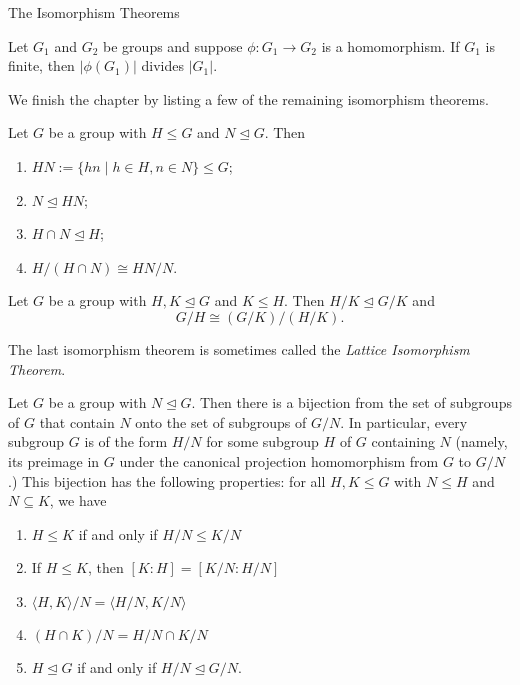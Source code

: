 \begin{section}{The Isomorphism Theorems}
\begin{theorem}
Let $G_1$ and $G_2$ be groups and suppose $\phi:G_1\to G_2$ is a homomorphism. If $G_1$ is finite, then $|\phi(G_1)|$ divides $|G_1|$.
\end{theorem}

We finish the chapter by listing a few of the remaining isomorphism theorems.%

\begin{theorem}
Let $G$ be a group with $H\leq G$ and $N\trianglelefteq G$.  Then
\begin{enumerate}[label=\textrm{(\alph*)}]
\item $HN:=\{hn\mid h\in H, n\in N\}\leq G$;
\item $N\trianglelefteq HN$;
\item $H\cap N\trianglelefteq H$;
\item $\displaystyle H/(H\cap N)\cong HN/N$.
\end{enumerate}
\end{theorem}

\begin{theorem}
Let $G$ be a group with $H,K\trianglelefteq G$ and $K\leq H$.  Then $H/K\trianglelefteq G/K$ and
\[
G/H\cong (G/K)/(H/K).
\]
\end{theorem}

The last isomorphism theorem is sometimes called the \emph{Lattice Isomorphism Theorem}.

\begin{theorem}

Let $G$ be a group with $N\trianglelefteq G$. Then there is a bijection from the set of subgroups of $G$ that contain $N$ onto the set of subgroups of $G/N$. In particular, every subgroup $G$ is of the form $H/N$ for some subgroup $H$ of $G$ containing $N$ (namely, its preimage in $G$ under the canonical projection homomorphism from $G$ to $G/N$.) This bijection has the following properties: for all $H,K \leq G$ with  $N\leq H$ and $N\subseteq K$, we have
\begin{enumerate}[label=\textrm{(\alph*)}]
\item $H\leq K$ if and only if $H/N \leq K/N$
\item If $H\leq K$, then $[K:H]=[K/N:H/N]$
\item $\langle H,K\rangle/N=\langle H/N,K/N\rangle$
\item $(H\cap K)/N=H/N \cap K/N$
\item $H\trianglelefteq G$ if and only if $H/N\trianglelefteq G/N$.
\end{enumerate}
\end{theorem}

\end{section}